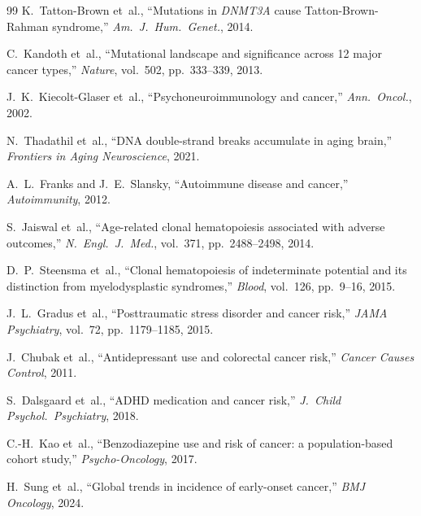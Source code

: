 \documentclass[11pt]{article}
\theoremstyle{definition}
\begin{document}
\begin{thebibliography}{99}
K.~Tatton-Brown et~al., ``Mutations in \emph{DNMT3A} cause
{T}atton-{B}rown-{R}ahman syndrome,'' \emph{Am.~J.~Hum.~Genet.},
2014.

C.~Kandoth et~al., ``Mutational landscape and significance across
12 major cancer types,'' \emph{Nature}, vol.~502, pp.~333--339,
2013.

J.~K.~Kiecolt-Glaser et~al., ``Psychoneuroimmunology and cancer,''
\emph{Ann.~Oncol.}, 2002.

N.~Thadathil et~al., ``{DNA} double-strand breaks accumulate in
aging brain,'' \emph{Frontiers in Aging Neuroscience}, 2021.

A.~L.~Franks and J.~E.~Slansky, ``Autoimmune disease and cancer,''
\emph{Autoimmunity}, 2012.

S.~Jaiswal et~al., ``Age-related clonal hematopoiesis associated
with adverse outcomes,'' \emph{N.~Engl.~J.~Med.}, vol.~371,
pp.~2488--2498, 2014.

D.~P.~Steensma et~al., ``Clonal hematopoiesis of indeterminate
potential and its distinction from myelodysplastic syndromes,''
\emph{Blood}, vol.~126, pp.~9--16, 2015.

J.~L.~Gradus et~al., ``Posttraumatic stress disorder and cancer
risk,'' \emph{JAMA Psychiatry}, vol.~72, pp.~1179--1185, 2015.

J.~Chubak et~al., ``Antidepressant use and colorectal cancer
risk,'' \emph{Cancer Causes Control}, 2011.

S.~Dalsgaard et~al., ``{ADHD} medication and cancer risk,''
\emph{J.~Child Psychol.~Psychiatry}, 2018.

C.-H.~Kao et~al., ``Benzodiazepine use and risk of cancer:
a population-based cohort study,'' \emph{Psycho-Oncology},
2017.

H.~Sung et~al., ``Global trends in incidence of early-onset
cancer,'' \emph{BMJ Oncology}, 2024.

\end{thebibliography}
\end{document}
